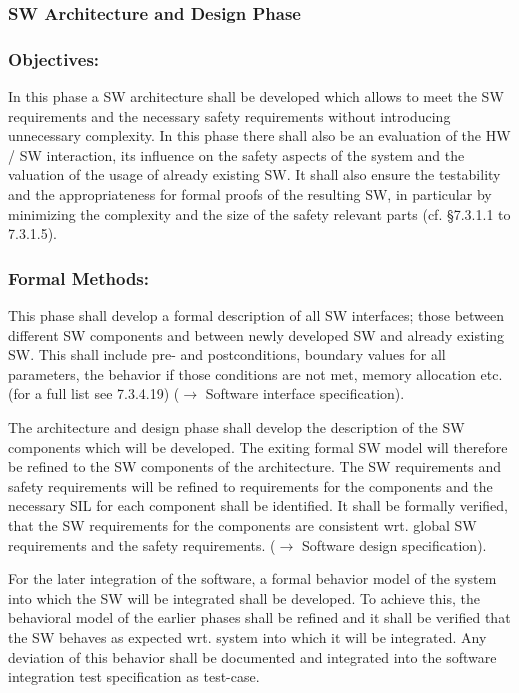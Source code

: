 \subsubsection{SW Architecture and Design Phase}
\label{sec:sw-arch-design}


\subsubsection{Objectives:}
\label{sec:sw-arch-objectives}
In this phase a SW architecture shall be developed which allows to meet the SW
requirements and the necessary safety requirements without introducing
unnecessary complexity. In this phase there shall also be an evaluation of the
HW / SW interaction, its influence on the safety aspects of the system and the
valuation of the usage of already existing SW. It shall also ensure the
testability and the appropriateness for formal proofs of the resulting SW, in
particular by minimizing the complexity and the size of the safety relevant
parts (cf. §7.3.1.1 to 7.3.1.5).

\subsubsection{Formal Methods:}
\label{sec:sw-arch-formal-methods}
This phase shall develop a formal description of all SW interfaces; those
between different SW components and between newly developed SW and already
existing SW. This shall include pre- and postconditions, boundary values for all
parameters, the behavior if those conditions are not met, memory allocation
etc. (for a full list see 7.3.4.19) ($\rightarrow$ Software interface
specification).

The architecture and design phase shall develop the description of the SW
components which will be developed. The exiting formal SW model will therefore
be refined to the SW components of the architecture. The SW requirements and
safety requirements will be refined to requirements for the components and the
necessary SIL for each component shall be identified. It shall be formally
verified, that the SW requirements for the components are consistent wrt. global
SW requirements and the safety requirements. ($\rightarrow$ Software design
specification).

For the later integration of the software, a formal behavior model of the system
into which the SW will be integrated shall be developed. To achieve this, the
behavioral model of the earlier phases shall be refined and it shall be verified
that the SW behaves as expected wrt. system into which it will be
integrated. Any deviation of this behavior shall be documented and integrated
into the software integration test specification as test-case.

